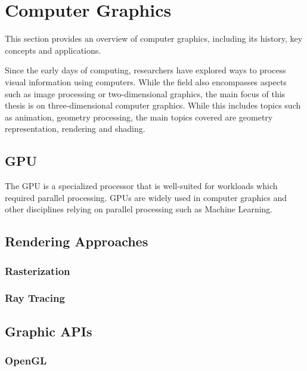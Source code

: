 
\section{Computer Graphics}

This section provides an overview of computer graphics, including its history, key concepts and applications.

Since the early days of computing, researchers have explored ways to process visual information using computers. While the field also encompasses aspects such as image processing or two-dimensional graphics, the main focus of this thesis is on three-dimensional computer graphics. While this includes topics such as animation, geometry processing, the main topics covered are geometry representation, rendering and shading.

\subsection{GPU}

The GPU is a specialized processor that is well-suited for workloads which required parallel processing. GPUs are widely used in computer graphics and other disciplines relying on parallel processing such as Machine Learning.

\subsection{Rendering Approaches}

\subsubsection{Rasterization}
\subsubsection{Ray Tracing}

\subsection{Graphic APIs}
\subsubsection{OpenGL}

